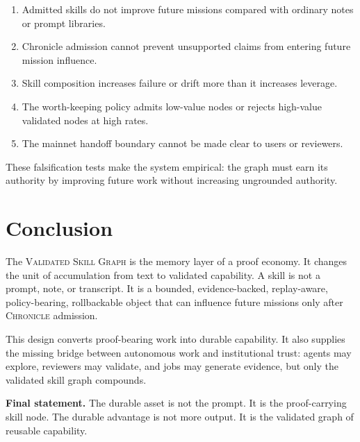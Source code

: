 \documentclass[10.5pt,oneside]{article}
\newcommand{\vsg}{\textsc{Validated Skill Graph}}
\newcommand{\chronicle}{\textsc{Chronicle}}
\begin{document}
\begin{enumerate}
  \item Admitted skills do not improve future missions compared with ordinary notes or prompt libraries.
  \item Chronicle admission cannot prevent unsupported claims from entering future mission influence.
  \item Skill composition increases failure or drift more than it increases leverage.
  \item The worth-keeping policy admits low-value nodes or rejects high-value validated nodes at high rates.
  \item The mainnet handoff boundary cannot be made clear to users or reviewers.
\end{enumerate}

These falsification tests make the system empirical: the graph must earn its authority by improving future work without increasing ungrounded authority.

\section{Conclusion}
The \vsg{} is the memory layer of a proof economy. It changes the unit of accumulation from text to validated capability. A skill is not a prompt, note, or transcript. It is a bounded, evidence-backed, replay-aware, policy-bearing, rollbackable object that can influence future missions only after \chronicle{} admission.

This design converts proof-bearing work into durable capability. It also supplies the missing bridge between autonomous work and institutional trust: agents may explore, reviewers may validate, and jobs may generate evidence, but only the validated skill graph compounds.

\begin{thesisbox}
\textbf{Final statement.} The durable asset is not the prompt. It is the proof-carrying skill node. The durable advantage is not more output. It is the validated graph of reusable capability.
\end{thesisbox}

\appendix
\end{document}
